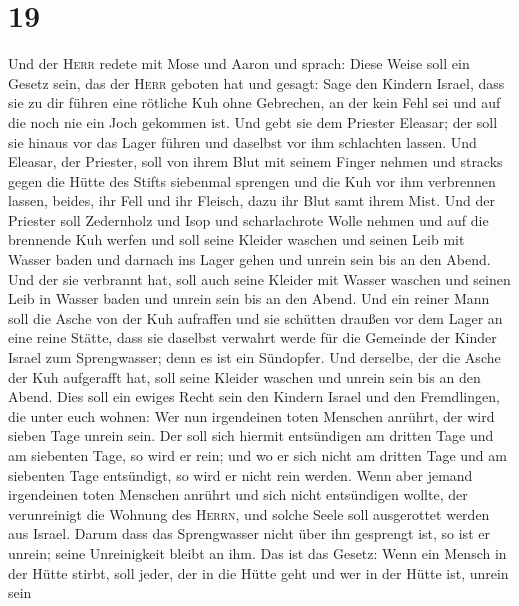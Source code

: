 \hypertarget{section-18}{%
\section{19}\label{section-18}}

 Und der \textsc{Herr} redete mit Mose und Aaron und
sprach:  Diese Weise soll ein Gesetz sein, das der
\textsc{Herr} geboten hat und gesagt: Sage den Kindern Israel, dass sie
zu dir führen eine rötliche Kuh ohne Gebrechen, an der kein Fehl sei und
auf die noch nie ein Joch gekommen ist.  Und gebt sie dem
Priester Eleasar; der soll sie hinaus vor das Lager führen und daselbst
vor ihm schlachten lassen.  Und Eleasar, der Priester,
soll von ihrem Blut mit seinem Finger nehmen und stracks gegen die Hütte
des Stifts siebenmal sprengen  und die Kuh vor ihm
verbrennen lassen, beides, ihr Fell und ihr Fleisch, dazu ihr Blut samt
ihrem Mist.  Und der Priester soll Zedernholz und Isop und
scharlachrote Wolle nehmen und auf die brennende Kuh werfen
 und soll seine Kleider waschen und seinen Leib mit Wasser
baden und darnach ins Lager gehen und unrein sein bis an den Abend.
 Und der sie verbrannt hat, soll auch seine Kleider mit
Wasser waschen und seinen Leib in Wasser baden und unrein sein bis an
den Abend.  Und ein reiner Mann soll die Asche von der Kuh
aufraffen und sie schütten draußen vor dem Lager an eine reine Stätte,
dass sie daselbst verwahrt werde für die Gemeinde der Kinder Israel zum
Sprengwasser; denn es ist ein Sündopfer.  Und derselbe,
der die Asche der Kuh aufgerafft hat, soll seine Kleider waschen und
unrein sein bis an den Abend. Dies soll ein ewiges Recht sein den
Kindern Israel und den Fremdlingen, die unter euch wohnen:
 Wer nun irgendeinen toten Menschen anrührt, der wird
sieben Tage unrein sein.  Der soll sich hiermit
entsündigen am dritten Tage und am siebenten Tage, so wird er rein; und
wo er sich nicht am dritten Tage und am siebenten Tage entsündigt, so
wird er nicht rein werden.  Wenn aber jemand irgendeinen
toten Menschen anrührt und sich nicht entsündigen wollte, der
verunreinigt die Wohnung des \textsc{Herrn}, und solche Seele soll
ausgerottet werden aus Israel. Darum dass das Sprengwasser nicht über
ihn gesprengt ist, so ist er unrein; seine Unreinigkeit bleibt an ihm.
 Das ist das Gesetz: Wenn ein Mensch in der Hütte stirbt,
soll jeder, der in die Hütte geht und wer in der Hütte ist, unrein sein
